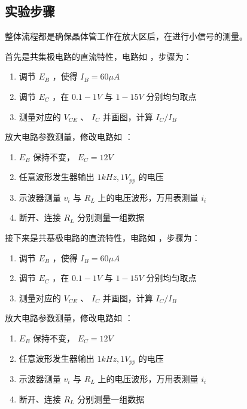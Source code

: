 \documentclass[lang=cn,11pt,a4paper,cite=authoryear]{elegantpaper}
\begin{document}


\subsection{实验步骤}

整体流程都是确保晶体管工作在放大区后，在进行小信号的测量。

首先是共集极电路的直流特性，电路如  ，步骤为：

\begin{enumerate}
    \item 调节 \(E_B\) ，使得 \(I_B = 60 \mu A\) 
    \item 调节 \(E_C\) ，在 \(0.1 - 1 V\) 与 \(1 - 15 V\) 分别均匀取点
    \item 测量对应的 \(V_{CE}\) 、 \(I_C\) 并画图，计算 \(I_C / I_B\) 
\end{enumerate}


放大电路参数测量，修改电路如 ：

\begin{enumerate}
    \item \(E_B\) 保持不变， \(E_C = 12 V \) 
    \item 任意波形发生器输出 \(1 kHz, 1 V_{pp }\)  的电压
    \item 示波器测量 \(v_{i}\) 与 \(R_L\) 上的电压波形，万用表测量 \(i_i\) 
    \item 断开、连接 \(R_L\) 分别测量一组数据
\end{enumerate}


接下来是共基极电路的直流特性，电路如  ，步骤为：

\begin{enumerate}
    \item 调节 \(E_B\) ，使得 \(I_B = 60 \mu A\) 
    \item 调节 \(E_C\) ，在 \(0.1 - 1 V\) 与 \(1 - 15 V\) 分别均匀取点
    \item 测量对应的 \(V_{CE}\) 、 \(I_C\) 并画图，计算 \(I_C / I_B\) 
\end{enumerate}



放大电路参数测量，修改电路如 ：

\begin{enumerate}
    \item \(E_B\) 保持不变， \(E_C = 12 V \) 
    \item 任意波形发生器输出 \(1 kHz, 1 V_{pp }\)  的电压
    \item 示波器测量 \(v_{i}\) 与 \(R_L\) 上的电压波形，万用表测量 \(i_i\) 
    \item 断开、连接 \(R_L\) 分别测量一组数据
\end{enumerate}
\end{document}
